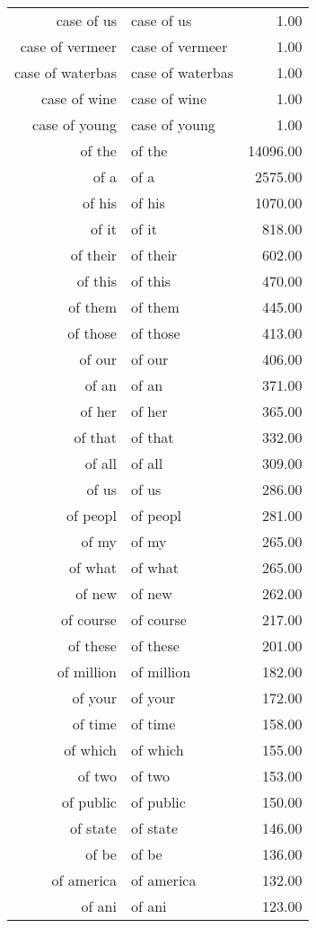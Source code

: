 \begin{table}[ht]
\begin{tabular}{rlr}
  case of us & case of us & 1.00 \\ 
  case of vermeer & case of vermeer & 1.00 \\ 
  case of waterbas & case of waterbas & 1.00 \\ 
  case of wine & case of wine & 1.00 \\ 
  case of young & case of young & 1.00 \\ 
  of the & of the & 14096.00 \\ 
  of a & of a & 2575.00 \\ 
  of his & of his & 1070.00 \\ 
  of it & of it & 818.00 \\ 
  of their & of their & 602.00 \\ 
  of this & of this & 470.00 \\ 
  of them & of them & 445.00 \\ 
  of those & of those & 413.00 \\ 
  of our & of our & 406.00 \\ 
  of an & of an & 371.00 \\ 
  of her & of her & 365.00 \\ 
  of that & of that & 332.00 \\ 
  of all & of all & 309.00 \\ 
  of us & of us & 286.00 \\ 
  of peopl & of peopl & 281.00 \\ 
  of my & of my & 265.00 \\ 
  of what & of what & 265.00 \\ 
  of new & of new & 262.00 \\ 
  of course & of course & 217.00 \\ 
  of these & of these & 201.00 \\ 
  of million & of million & 182.00 \\ 
  of your & of your & 172.00 \\ 
  of time & of time & 158.00 \\ 
  of which & of which & 155.00 \\ 
  of two & of two & 153.00 \\ 
  of public & of public & 150.00 \\ 
  of state & of state & 146.00 \\ 
  of be & of be & 136.00 \\ 
  of america & of america & 132.00 \\ 
  of ani & of ani & 123.00 \\ 

\end{tabular}
\end{table}
